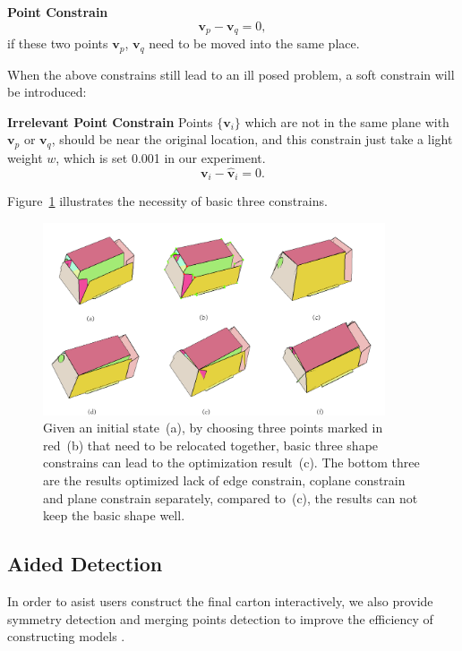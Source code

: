 \noindent
\textbf{Point Constrain} 
\begin{equation}
\mathbf{v}_p - \mathbf{v}_q = 0,
\label{equ:point}
\end{equation}
if these two points $\mathbf{v}_p$, $\mathbf{v}_q$ need to be moved into the same place.

When the above constrains still lead to an ill posed problem, a soft constrain will be introduced:

\noindent
\textbf{Irrelevant Point Constrain} Points $\{\mathbf{v}_i\}$ which are not in the same plane with $\mathbf{v}_p$ or $\mathbf{v}_q$, should be near the original location, and this constrain just take a light weight $w$, which is set 0.001 in our experiment. 
\begin{equation}
\mathbf{v}_i - \mathbf{\hat{v}}_i = 0.
\label{equ:irrelevant}
\end{equation}

Figure~\ref{fig:constrain} illustrates the necessity of basic three constrains.

\begin{figure}
	\centering
	\includegraphics[width=0.9\textwidth]{images/constrain.jpg}
	\caption{Given an initial state~(a), by choosing three points marked in red~(b) that need to be relocated together, basic three shape constrains can lead to the optimization result~(c). The bottom three are the results optimized lack of edge constrain, coplane constrain and plane constrain separately, compared to~(c), the results can not keep the basic shape well.}
	\label{fig:constrain}
\end{figure}


\subsection{Aided Detection}
In order to asist users construct the final carton interactively, we also provide symmetry detection and merging points detection to improve the efficiency of constructing models .


